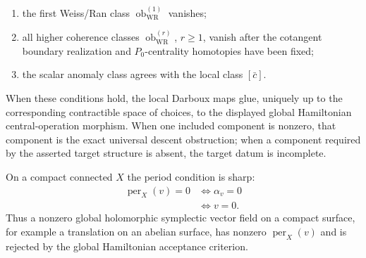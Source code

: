 \begin{thm}
\begin{enumerate}[label=(\alph*)]
\[        \delta(-\iota_v\omega)\in H^1(X,\C_X)
      \]
      equal to zero;
    \item the first Weiss/Ran class
      \(\operatorname{ob}^{(1)}_{\mathrm{WR}}\) vanishes;
    \item all higher coherence classes
      \(\operatorname{ob}^{(r)}_{\mathrm{WR}}\), \(r\ge1\), vanish after
      the cotangent boundary realization and \(P_0\)-centrality homotopies
      have been fixed;
    \item the scalar anomaly class agrees with the local class
      \([\bar c]\).
  \end{enumerate}
  When these conditions hold, the local Darboux maps glue, uniquely up to
  the corresponding contractible space of choices, to the displayed
  global Hamiltonian central-operation morphism.  When one included
  component is nonzero, that component is the exact universal descent
  obstruction; when a component required by the asserted target structure
  is absent, the target datum is incomplete.

  On a compact connected \(X\) the period condition is sharp:
  \[
  \begin{aligned}
    \operatorname{per}_X(v)=0
      &\Longleftrightarrow \alpha_v=0\\
      &\Longleftrightarrow v=0 .
  \end{aligned}
  \]
  Thus a nonzero global holomorphic symplectic vector field on a compact
  surface, for example a translation on an abelian surface, has nonzero
  \(\operatorname{per}_X(v)\) and is rejected by the global Hamiltonian
  acceptance criterion.
\end{thm}

